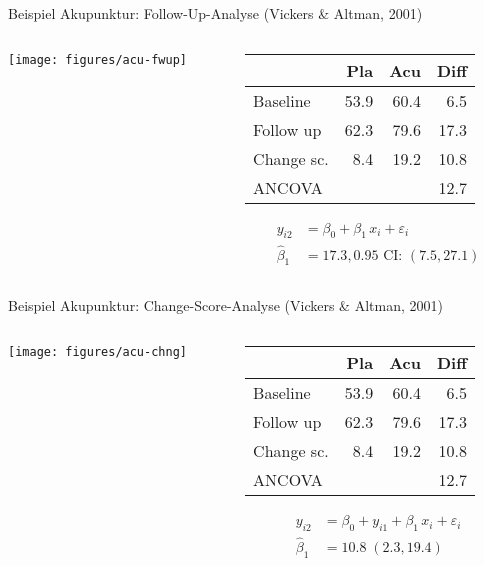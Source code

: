 \documentclass{beamer}
\begin{document}
\begin{frame}{Beispiel}
Akupunktur: Follow-Up-Analyse (Vickers \& Altman, 2001)
\begin{columns}[T]
\begin{column}{5.5cm}
  \texttt{[image: figures/acu-fwup]}
\end{column}
%
\begin{column}{5.5cm}
  \vspace*{1em}\small
  \begin{tabular}{lrrr}
  \hline
             &  Pla &  Acu & Diff \\ \hline
  Baseline   & 53.9 & 60.4 &  6.5 \\
  Follow up  & 62.3 & 79.6 & 17.3 \\
  Change sc. &  8.4 & 19.2 & 10.8 \\
  ANCOVA     &      &      & 12.7 \\ \hline
  \end{tabular}
\begin{align*}
         y_{i2} &= \beta_0 + \beta_1 \, x_i + \varepsilon_i \\
  \hat{\beta}_1 &= 17.3, 0.95\text{ CI: } (7.5, 27.1)
\end{align*}
\end{column}
\end{columns}
\end{frame}


\begin{frame}{Beispiel}
Akupunktur: Change-Score-Analyse (Vickers \& Altman, 2001)
\begin{columns}[T]
\begin{column}{5.5cm}
  \texttt{[image: figures/acu-chng]}
\end{column}
%
\begin{column}{5.5cm}
  \vspace*{1em}\small
  \begin{tabular}{lrrr}
  \hline
             &  Pla &  Acu & Diff \\ \hline
  Baseline   & 53.9 & 60.4 &  6.5 \\
  Follow up  & 62.3 & 79.6 & 17.3 \\
  Change sc. &  8.4 & 19.2 & 10.8 \\
  ANCOVA     &      &      & 12.7 \\ \hline
  \end{tabular}
\begin{align*}
         y_{i2} &= \beta_0 + y_{i1} + \beta_1 \, x_i + \varepsilon_i \\
  \hat{\beta}_1 &= 10.8 \; (2.3, 19.4)
\end{align*}
\end{column}
\end{columns}
\end{frame}
\end{document}

